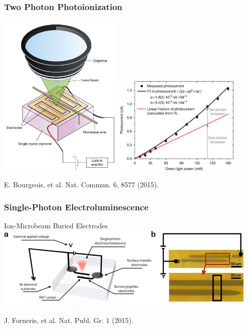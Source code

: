 \documentclass{beamer}
\begin{document}
\begin{frame}\frametitle{Two Photon Photoionization}
    \centering
    \includegraphics[width=0.45\textwidth]{Images/TwoPhotonGroup.png}
    \includegraphics[width=0.45\textwidth]{Images/TwoPhotonPlot.jpg}

    E. Bourgeois, et al. Nat. Commun. 6, 8577 (2015).
\end{frame}

\begin{frame}\frametitle{Single-Photon Electroluminescence}
    \begin{block}{Ion-Microbeam Buried Electrodes}
        \centering
        \includegraphics[width=0.95\textwidth]{Images/Electrolumin.jpg}

        J. Forneris, et al. Nat. Publ. Gr. 1 (2015).
    \end{block}
\end{frame}
\end{document}
